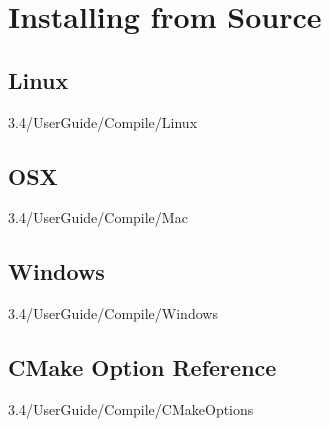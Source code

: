 \section{Installing from Source}
\label{s:installation:source}

\subsection{Linux}
3.4/UserGuide/Compile/Linux

\subsection{OSX}
3.4/UserGuide/Compile/Mac

\subsection{Windows}
3.4/UserGuide/Compile/Windows

\subsection{CMake Option Reference}
\label{s:installation:source:cmake}
3.4/UserGuide/Compile/CMakeOptions
